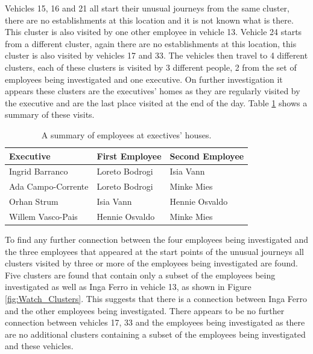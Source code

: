 \noindent Vehicles 15, 16 and 21 all start their unusual journeys from the same cluster, there are no establishments at this location and it is not known what is there. This cluster is also visited by one other employee in vehicle 13. Vehicle 24 starts from a different cluster, again there are no establishments at this location, this cluster is also visited by vehicles 17 and 33. The vehicles then travel to 4 different clusters, each of these clusters is visited by 3 different people, 2 from the set of employees being investigated and one executive. On further investigation it appears these clusters are the executives’ homes as they are regularly visited by the executive and are the last place visited at the end of the day. Table \ref{table:watch_table} shows a summary of these visits.


\begin{table}[H]
\begin{center}
\begin{tabular}{|l|l|l|}
\hline
Executive & First Employee & Second Employee \\ \hline \hline

Ingrid Barranco &Loreto Bodrogi &Isia Vann \\ \hline
Ada Campo-Corrente&Loreto Bodrogi&Minke Mies\\ \hline
Orhan Strum&Isia Vann& Hennie Osvaldo\\ \hline
Willem Vasco-Pais&Hennie Osvaldo& Minke Mies\\ \hline
\hline

\end{tabular}
\caption{\label{table:watch_table}A summary of employees at exectives' houses.}
\end{center}
\end{table}


\noindent To find any further connection between the four employees being investigated and the three employees that appeared at the start points of the unusual journeys all clusters visited by three or more of the employees being investigated are found. Five clusters are found that contain only a subset of the employees being investigated as well as Inga Ferro in vehicle 13, as shown in Figure \ref{fig:Watch_Clusters}. This suggests that there is a connection between Inga Ferro and the other employees being investigated. There appears to be no further connection between vehicles 17, 33 and the employees being investigated as there are no additional clusters containing a subset of the employees being investigated and these vehicles. 

